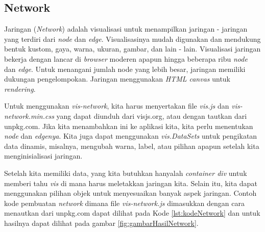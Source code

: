 \subsection{Network}
Jaringan (\textit{Network}) adalah visualisasi untuk menampilkan jaringan - jaringan yang terdiri dari \textit{node} dan \textit{edge}. Visualisasinya mudah digunakan dan mendukung bentuk kustom, gaya, warna, ukuran, gambar, dan lain - lain. Visualisasi jaringan bekerja dengan lancar di \textit{browser} moderen apapun hingga beberapa ribu \textit{node} dan \textit{edge}. Untuk menangani jumlah node yang lebih besar, jaringan memiliki dukungan pengelompokan. Jaringan menggunakan \textit{HTML canvas} untuk \textit{rendering}. \cite{network}

Untuk menggunakan \textit{vis-network}, kita harus menyertakan file \textit{vis.js} dan \textit{vis-network.min.css} yang dapat diunduh dari visjs.org, atau dengan tautkan dari unpkg.com. Jika kita menambahkan ini ke aplikasi kita, kita perlu menentukan \textit{node} dan \textit{edgenya}. Kita juga dapat menggunakan \textit{vis.DataSets} untuk pengikatan data dinamis, misalnya, mengubah warna, label, atau pilihan apapun setelah kita menginisialisasi jaringan.

Setelah kita memiliki data, yang kita butuhkan hanyalah \textit{container div} untuk memberi tahu \textit{vis} di mana harus meletakkan jaringan kita. Selain itu, kita dapat menggunakan pilihan objek untuk menyesuaikan banyak aspek jaringan. Contoh kode pembuatan \textit{network}  dimana file \textit{vis-network.js} dimasukkan dengan cara menautkan dari unpkg.com dapat dilihat pada Kode \ref{lst:kodeNetwork} dan untuk hasilnya dapat dilihat pada gambar \ref{fig:gambarHasilNetwork}.

